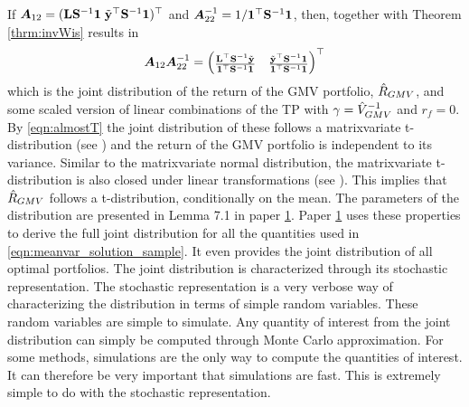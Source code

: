 \documentclass[12pt, oneside]{book}\usepackage{knitr}
\begin{document}
If $\mbox{\boldmath$A$}_{12}=(\mathbf{L} \mathbf{S}^{-1} \mathbf{1} \; \tilde{\mathbf{y}}^\top \mathbf{S}^{-1} \mathbf{1})^\top$ and $\mbox{\boldmath$A$}_{22}^{-1}=1/\mathbf{1}^\top \mathbf{S}^{-1} \mathbf{1}$, then, together with Theorem \ref{thrm:invWis} results in
$$
\mbox{\boldmath$A$}_{12}\mbox{\boldmath$A$}^{-1}_{22}= 
\begin{pmatrix}
  \frac{\mathbf{L}^\top \mathbf{S}^{-1} \tilde {\mathbf{y}}}{\mathbf{1}^\top \mathbf{S}^{-1} \mathbf{1}} &
  \frac{\tilde{\mathbf{y}}^\top \mathbf{S}^{-1} \mathbf{1}}{\mathbf{1}^\top \mathbf{S}^{-1} \mathbf{1}}
\end{pmatrix}^\top
$$
which is the joint distribution of the return of the GMV portfolio, $\hat{R}_{GMV}$, and some scaled version of linear combinations of the TP with $\gamma = \hat{V}_{GMV}^{-1}$ and $r_f=0$.
By \eqref{eqn:almostT} the joint distribution of these follows a matrixvariate t-distribution (see \citet[Definition 4.2.1 in]{GuptaNagar2000}) and the return of the GMV portfolio is independent to its variance. 
Similar to the matrixvariate normal distribution, the matrixvariate t-distribution is also closed under linear transformations (see \citet[Theorem 4.3.5 in]{GuptaNagar2000}).
This implies that $\hat{R}_{GMV}$ follows a t-distribution, conditionally on the mean.
The parameters of the distribution are presented in Lemma 7.1 in paper \hyperref[sec:paper1]{1}. 
Paper \hyperref[sec:paper1]{1} uses these properties to derive the full joint distribution for all the quantities used in \eqref{eqn:meanvar_solution_sample}.
It even provides the joint distribution of all optimal portfolios. 
The joint distribution is characterized through its stochastic representation.
The stochastic representation is a very verbose way of characterizing the distribution in terms of simple random variables.
These random variables are simple to simulate.
Any quantity of interest from the joint distribution can simply be computed through Monte Carlo approximation. 
For some methods, simulations are the only way to compute the quantities of interest.
It can therefore be very important that simulations are fast.
This is extremely simple to do with the stochastic representation.
\end{document}
